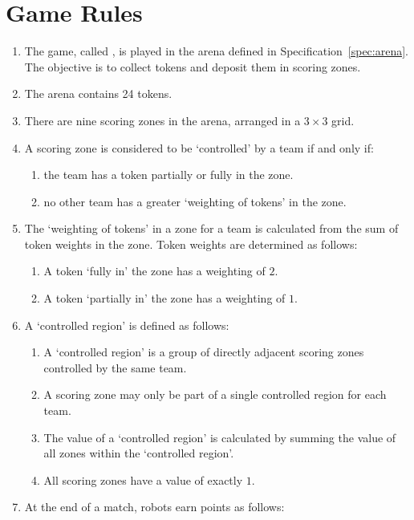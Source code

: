 \section{Game Rules}
\label{sec:rules}

\begin{enumerate}
  \item The game, called \emph{\gamename}, is played in the arena defined in
        Specification~\ref{spec:arena}. The objective is to collect tokens and
        deposit them in scoring zones.
  \item The arena contains 24 tokens.
  \item There are nine scoring zones in the arena, arranged in a $3\times3$
        grid.
  \item A scoring zone is considered to be `controlled' by a team if and only if:
    \begin{enumerate}
      \item the team has a token partially or fully in the zone.
      \item no other team has a greater `weighting of tokens' in the zone.
    \end{enumerate}
  \item The `weighting of tokens' in a zone for a team is calculated from the sum of token weights in the zone.
      Token weights are determined as follows:
      \begin{enumerate}
            \item A token `fully in' the zone has a weighting of $2$.
            \item A token `partially in' the zone has a weighting of $1$.
    \end{enumerate}
  \item A `controlled region' is defined as follows:
    \begin{enumerate}
      \item A `controlled region' is a group of directly adjacent scoring zones controlled by the same team.
      \item A scoring zone may only be part of a single controlled region for each team.
      \item The value of a `controlled region' is calculated by summing the value of all zones within the `controlled region'.
      \item All scoring zones have a value of exactly $1$.
    \end{enumerate}
  \item At the end of a match, robots earn points as follows:

\end{enumerate}
